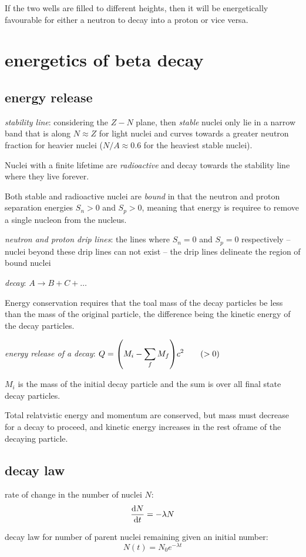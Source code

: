 \documentclass[10pt, a4paper, twocolumn]{article}
\newcommand{\deff}[1]{\par \noindent \textit{#1}: }
\newcommand{\n}{\par \noindent}
\begin{document}
If the two wells are filled to different heights, then it will be energetically favourable for either a neutron to decay into a proton or vice versa.

\section{energetics of beta decay}
\subsection{energy release}

\deff{stability line}
considering the $Z-N$ plane, then \emph{stable} nuclei only lie in a narrow band that is along $N\approx Z$ for light nuclei and curves towards a greater neutron fraction for heavier nuclei ($N/A \approx 0.6$ for the heaviest stable nuclei).

Nuclei with a finite lifetime are \emph{radioactive} and decay towards the stability line where they live forever.

Both stable and radioactive nuclei are \emph{bound} in that the neutron and proton separation energies $S_n>0$ and $S_p>0$, meaning that energy is requiree to remove a single nucleon from the nucleus.

\deff{neutron and proton drip lines}
the lines where $S_n=0$ and $S_p=0$ respectively -- nuclei beyond these drip lines can not exist -- the drip lines delineate the region of bound nuclei

\deff{decay} $A\rightarrow B+C+\ldots$ \n
Energy conservation requires that the toal mass of the decay particles be less than the mass of the original particle, the difference being the kinetic energy of the decay particles.
\deff{energy release of a decay}
$\displaystyle Q=\qty(M_i-\sum _fM_f)c^2\qquad (>0)$ \n
$M_i$ is the mass of the initial decay particle and the sum is over all final state decay particles.

Total relatvistic energy and momentum are conserved, but mass must decrease for a decay to proceed, and kinetic energy increases in the rest oframe of the decaying particle.

\subsection{decay law}

rate of change in the number of nuclei $N$:
\[\dv{N}{t}=-\lambda N\]

decay law for number of parent nuclei remaining given an initial number:
\[ N(t)=N_0e^{-\lambda t} \]
\end{document}
